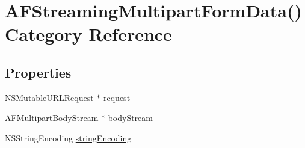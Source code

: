 \hypertarget{category_a_f_streaming_multipart_form_data_07_08}{\section{A\-F\-Streaming\-Multipart\-Form\-Data() Category Reference}
\label{category_a_f_streaming_multipart_form_data_07_08}
}
\subsection*{Properties}
\begin{DoxyCompactItemize}
\item 
N\-S\-Mutable\-U\-R\-L\-Request $\ast$ \hyperlink{category_a_f_streaming_multipart_form_data_07_08_a2d0be87dd88432deeb33e4dfea850e48}{request}
\item 
\hyperlink{interface_a_f_multipart_body_stream}{A\-F\-Multipart\-Body\-Stream} $\ast$ \hyperlink{category_a_f_streaming_multipart_form_data_07_08_a41a2435c709facb4f2ae4e6ac644088e}{body\-Stream}
\item 
N\-S\-String\-Encoding \hyperlink{category_a_f_streaming_multipart_form_data_07_08_aad982e1c61bf6c3416c3e4596dfdf07b}{string\-Encoding}
\end{DoxyCompactItemize}


